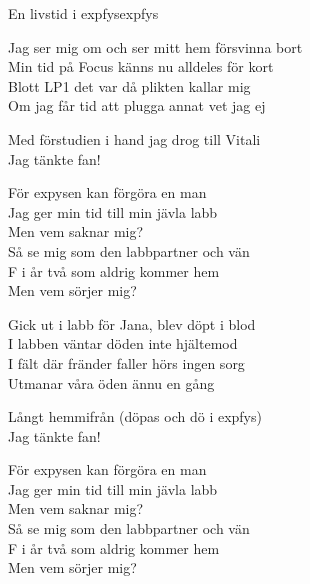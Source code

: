 \begin{song}{En livstid i expfys}{expfys}
\begin{vers}
Jag ser mig om och ser mitt hem försvinna bort\\
Min tid på Focus känns nu alldeles för kort\\
Blott LP1 det var då plikten kallar mig\\
Om jag får tid att plugga annat vet jag ej\\
\end{vers}

\begin{vers}
Med förstudien i hand jag drog till Vitali\\
Jag tänkte fan!\\
\end{vers}

\begin{vers}
För expysen kan förgöra en man\\
Jag ger min tid till min jävla labb\\
Men vem saknar mig?\\
Så se mig som den labbpartner och vän\\
F i år två som aldrig kommer hem\\
Men vem sörjer mig?\\
\end{vers}

\begin{vers}
Gick ut i labb för Jana, blev döpt i blod\\
I labben väntar döden inte hjältemod\\
I fält där fränder faller hörs ingen sorg\\
Utmanar våra öden ännu en gång\\
\end{vers}

\begin{vers}
Långt hemmifrån (döpas och dö i expfys)\\
Jag tänkte fan!\\
\end{vers}

\begin{vers}
För expysen kan förgöra en man\\
Jag ger min tid till min jävla labb\\
Men vem saknar mig?\\
Så se mig som den labbpartner och vän\\
F i år två som aldrig kommer hem\\
Men vem sörjer mig?\\
\end{vers}


\end{song}
